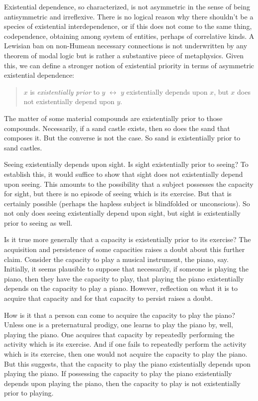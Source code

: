\documentclass[12pt]{article}
\begin{document}
Existential dependence, so characterized, is not asymmetric in the sense of being antisymmetric and irreflexive. There is no logical reason why there shouldn't be a species of existential interdependence, or if this does not come to the same thing, codependence, obtaining among system of entities, perhaps of correlative kinds. A Lewisian ban on non-Humean necessary connections is not underwritten by any theorem of modal logic but is rather a substantive piece of metaphysics. Given this, we can define a stronger notion of existential priority in terms of asymmetric existential dependence:
\begin{quote}
    \( x \) is \emph{existentially prior} to \( y \) \( \leftrightarrow \) \( y \) existentially depends upon \( x \), but \( x \) does not existentially depend upon \( y \).
\end{quote}
The matter of some material compounds are existentially prior to those compounds. Necessarily, if a sand castle exists, then so does the sand that composes it. But the converse is not the case. So sand is existentially prior to sand castles.

Seeing existentially depends upon sight. Is sight existentially prior to seeing? To establish this, it would suffice to show that sight does not existentially depend upon seeing. This amounts to the possibility that a subject possesses the capacity for sight, but there is no episode of seeing which is its exercise. But that is certainly possible (perhaps the hapless subject is blindfolded or unconscious). So not only does seeing existentially depend upon sight, but sight is existentially prior to seeing as well.

Is it true more generally that a capacity is existentially prior to its exercise? The acquisition and persistence of some capacities raises a doubt about this further claim. Consider the capacity to play a musical instrument, the piano, say. Initially, it seems plausible to suppose that necessarily, if someone is playing the piano, then they have the capacity to play, that playing the piano existentially depends on the capacity to play a piano. However, reflection on what it is to acquire that capacity and for that capacity to persist raises a doubt. 

How is it that a person can come to acquire the capacity to play the piano? Unless one is a preternatural prodigy, one learns to play the piano by, well, playing the piano. One acquires that capacity by repeatedly performing the activity which is its exercise. And if one fails to repeatedly perform the activity which is its exercise, then one would not acquire the capacity to play the piano. But this suggests, that the capacity to play the piano existentially depends upon playing the piano. If possessing the capacity to play the piano existentially depends upon playing the piano, then the capacity to play is not existentially prior to playing. 
\end{document}
